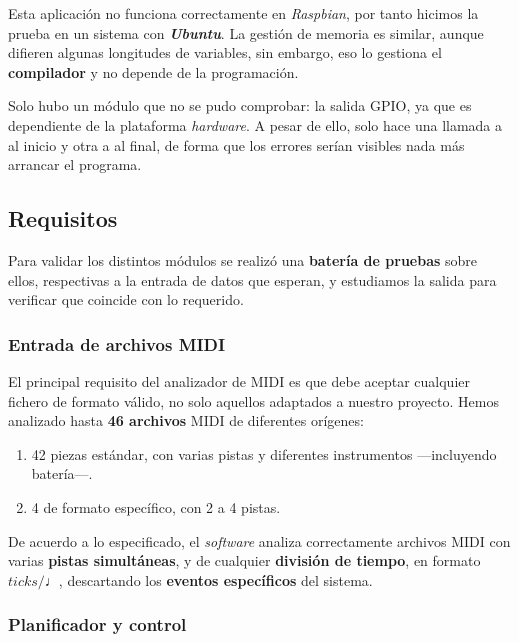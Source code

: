 Esta aplicación no funciona correctamente en \textit{Raspbian}, por tanto hicimos la prueba en un sistema con \textbf{\textit{Ubuntu}}. La gestión de memoria es similar, aunque difieren algunas longitudes de variables, sin embargo, eso lo gestiona el \textbf{compilador} y no depende de la programación.

Solo hubo un módulo que no se pudo comprobar: la salida \acrshort{GPIO}, ya que es dependiente de la plataforma \textit{hardware}. A pesar de ello, solo hace una llamada a  al inicio y otra a  al final, de forma que los errores serían visibles nada más arrancar el programa.

\subsection{Requisitos}

Para validar los distintos módulos se realizó una \textbf{batería de pruebas} sobre ellos, respectivas a la entrada de datos que esperan, y estudiamos la salida para verificar que coincide con lo requerido.

\subsubsection{Entrada de archivos MIDI}

El principal requisito del analizador de \acrshort{MIDI} es que debe aceptar cualquier fichero de formato válido, no solo aquellos adaptados a nuestro proyecto. Hemos analizado hasta \textbf{46 archivos} \acrshort{MIDI} de diferentes orígenes:

\begin{enumerate}
	\item 42 piezas estándar, con varias pistas y diferentes instrumentos ---incluyendo batería---.
	\item 4 de formato específico, con 2 a 4 pistas.
\end{enumerate}

De acuerdo a lo especificado, el \textit{software} analiza correctamente archivos \acrshort{MIDI} con varias \textbf{pistas simultáneas}, y de cualquier \textbf{división de tiempo}, en formato $ticks / \quarternote$, descartando los \textbf{eventos específicos} del sistema.

\subsubsection{Planificador y control}

